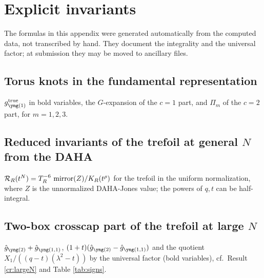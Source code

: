 \section{Explicit invariants}\label{app:data}
The formulas in this appendix were generated automatically from the computed data, not transcribed by hand. They document the integrality and the universal factor; at submission they may be moved to ancillary files.

\subsection{Torus knots in the fundamental representation}\label{app:torus}
$g^{\mathrm{true}}_{\yone}$ in bold variables, the $G$-expansion of the $c = 1$ part, and $\Pi_m$ of the $c = 2$ part, for $m = 1, 2, 3$.

\medskip\noindent


\subsection{Reduced invariants of the trefoil at general \texorpdfstring{$N$}{N} from the DAHA}\label{app:daha}
$\mathcal{R}_R(t^N) = T_R^{-6}\,\operatorname{mirror}(Z)/K_R(t^\rho)$ for the trefoil in the uniform normalization, where $Z$ is the unnormalized DAHA-Jones value; the powers of $q, t$ can be half-integral.

\medskip\noindent


\subsection{Two-box crosscap part of the trefoil at large \texorpdfstring{$N$}{N}}\label{app:largeN}
$\hat g_{\ytwo} + \hat g_{\yoneone}$, $(1+t)(\hat g_{\ytwo} - \hat g_{\yoneone})$ and the quotient $X_1/((q-t)(\lambda^2-t))$ by the universal factor (bold variables), cf.\ Result \ref{cr:largeN} and Table \ref{tab:signs}.

\medskip\noindent



